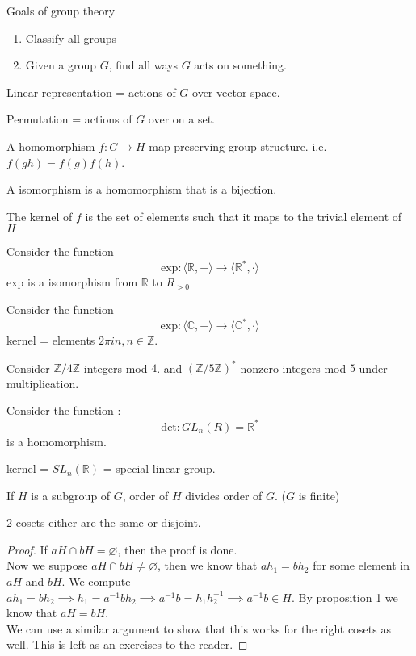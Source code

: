 \documentclass[12pt,letterpaper]{article}
\renewcommand{\b}{\mathbb}
\begin{document}
\begin{remark}
	Goals of group theory
	\begin{enumerate}
		\item Classify all groups
		\item Given a group $G$, find all ways $G$ acts on something.
	\end{enumerate}
\end{remark}
\begin{example}
	Linear representation = actions of $G$ over vector space.

	Permutation = actions of $G$ over on a set.
\end{example}
\begin{definition}
	A homomorphism $f: G \to H$ map preserving group structure. i.e. $f(gh) = f(g)f(h)$.

	A isomorphism is a homomorphism that is a bijection. 

	The kernel of $f$ is the set of elements such that it maps to the trivial element of $H$ 
\end{definition}
\begin{example}
	Consider the function
	\[ \mathrm{exp} : \langle \b R, + \rangle \to \langle \b R^*, \cdot \rangle\]
	exp is a isomorphism from $\b R$ to $R_{> 0}$
\end{example}
\begin{example}
	Consider the function
	\[ \mathrm{exp} : \langle \b C, + \rangle \to \langle \b C^*, \cdot \rangle\]
	kernel = elements $2\pi i n, n \in \b Z$.
\end{example}
\begin{example}
	Consider $\b Z/4 \b Z$ integers mod $4$. and $\left( \b Z/ 5 \b Z \right)^*$ nonzero integers mod $5$ under multiplication.
\end{example}
\begin{example}
	Consider the function :
	\[ \mathrm{det} : GL_n(R) = \b R^*\]
	is a homomorphism.

	kernel = $SL_n(\b R)$ = special linear group.
\end{example}
\begin{theorem}
	If $H$ is a subgroup of $G$, order of $H$ divides order of $G$. ($G$ is finite)
\end{theorem}
\begin{lemma}
	2 cosets either are the same or disjoint.
\end{lemma}
\begin{proof}
    If $aH \cap bH = \varnothing$, then the proof is done. \\
    Now we suppose $aH \cap bH \neq \varnothing$, then we know that $ah_1 = bh_2$ for some element in $aH$ and $bH$. We compute $ah_1 = bh_2 \implies h_1 = a^{-1}bh_2 \implies a^{-1}b = h_1h_2^{-1} \implies a^{-1}b \in H$. By proposition 1 we know that $aH = bH$. \\
    We can use a similar argument to show that this works for the right cosets as well. This is left as an exercises to the reader. 
\end{proof}
\end{document}
